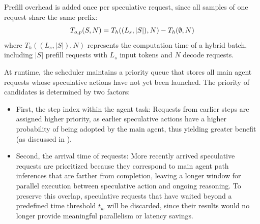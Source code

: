 Prefill overhead is added once per speculative request, since all samples of one request share the same prefix:
\begin{equation}
    \small
    T_{o, p}(S, N) = T_h((L_s, |S|), N) - T_h(\emptyset, N)
\end{equation}
where $T_h((L_s, |S|), N)$ represents the computation time of a hybrid batch, including $|S|$ prefill requests with $L_s$ input tokens and $N$ decode requests.
\begin{algorithm}[t]
\small
    \caption{Runtime Speculation Selection}
    \label{algo:intra-spec}
    \SetAlgoLined
    \BlankLine
\end{algorithm}

At runtime, the scheduler maintains a priority queue that stores all main agent requests whose speculative actions have not yet been launched.
The priority of candidates is determined by two factors:
\begin{itemize}[leftmargin=*]
    \item First, the step index within the agent task: 
Requests from earlier steps are assigned higher priority, as earlier speculative actions have a higher probability of being adopted by the main agent, thus yielding greater benefit (as discussed in ).
    \item Second, the arrival time of requests: 
More recently arrived speculative requests are prioritized because they correspond to main agent path inferences that are farther from completion, leaving a longer window for parallel execution between speculative action and ongoing reasoning. 
To preserve this overlap, speculative requests that have waited beyond a predefined time threshold $t_w$ will be discarded, since their results would no longer provide meaningful parallelism or latency savings.
\end{itemize}


